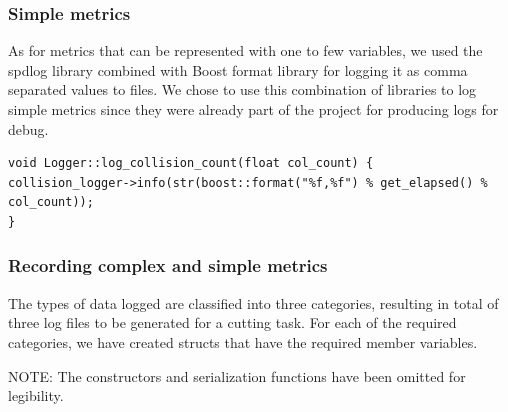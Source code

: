 \subsubsection{Simple metrics}
As for metrics that can be represented with one to few variables, we used the spdlog library combined with Boost format library for logging it as comma separated values to files. We chose to use this combination of libraries to log simple metrics since they were already part of the project for producing logs for debug.

\begin{lstlisting}[style=CStyle]
void Logger::log_collision_count(float col_count) {
collision_logger->info(str(boost::format("%f,%f") % get_elapsed() % col_count));
}
\end{lstlisting}

\subsubsection{Recording complex and simple metrics}
The types of data logged are classified into three categories, resulting in total of three log files to be generated for a cutting task. For each of the required categories, we have created structs that have the required member variables.

NOTE: The constructors and serialization functions have been omitted for legibility.

